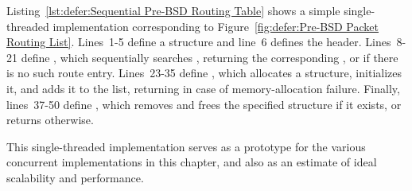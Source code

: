 Listing~\ref{lst:defer:Sequential Pre-BSD Routing Table}
shows a simple single-threaded implementation corresponding to
Figure~\ref{fig:defer:Pre-BSD Packet Routing List}.
Lines~1-5 define a  structure and line~6 defines
the  header.
Lines~8-21 define , which sequentially searches
, returning the corresponding , or
 if there is no such route entry.
Lines~23-35 define , which allocates a
 structure, initializes it, and adds it to the
list, returning  in case of memory-allocation failure.
Finally, lines~37-50 define , which removes and
frees the specified  structure if it exists,
or returns  otherwise.

This single-threaded implementation serves as a prototype for the various
concurrent implementations in this chapter, and also as an estimate of
ideal scalability and performance.









